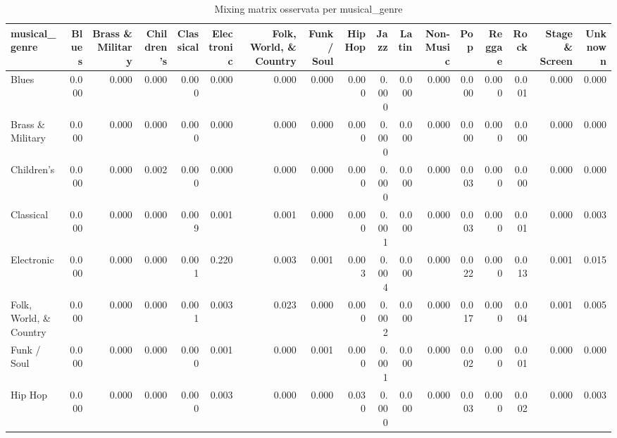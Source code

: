 \begin{table}
\centering
\caption{Mixing matrix osservata per musical_genre}
\label{tab:t3_mixing_genere_musicale_osservata}
\begin{tabular}{lrrrrrrrrrrrrrrrr}
\toprule
         musical\_genre &  Blues &  Brass \& Military &  Children's &  Classical &  Electronic &  Folk, World, \& Country &  Funk / Soul &  Hip Hop &  Jazz &  Latin &  Non-Music &   Pop &  Reggae &  Rock &  Stage \& Screen &  Unknown \\
\midrule
                 Blues &  0.000 &             0.000 &       0.000 &      0.000 &       0.000 &                   0.000 &        0.000 &    0.000 & 0.000 &  0.000 &      0.000 & 0.000 &   0.000 & 0.001 &           0.000 &    0.000 \\
      Brass \& Military &  0.000 &             0.000 &       0.000 &      0.000 &       0.000 &                   0.000 &        0.000 &    0.000 & 0.000 &  0.000 &      0.000 & 0.000 &   0.000 & 0.000 &           0.000 &    0.000 \\
            Children's &  0.000 &             0.000 &       0.002 &      0.000 &       0.000 &                   0.000 &        0.000 &    0.000 & 0.000 &  0.000 &      0.000 & 0.003 &   0.000 & 0.000 &           0.000 &    0.000 \\
             Classical &  0.000 &             0.000 &       0.000 &      0.009 &       0.001 &                   0.001 &        0.000 &    0.000 & 0.001 &  0.000 &      0.000 & 0.003 &   0.000 & 0.001 &           0.000 &    0.003 \\
            Electronic &  0.000 &             0.000 &       0.000 &      0.001 &       0.220 &                   0.003 &        0.001 &    0.003 & 0.004 &  0.000 &      0.000 & 0.022 &   0.000 & 0.013 &           0.001 &    0.015 \\
Folk, World, \& Country &  0.000 &             0.000 &       0.000 &      0.001 &       0.003 &                   0.023 &        0.000 &    0.000 & 0.002 &  0.000 &      0.000 & 0.017 &   0.000 & 0.004 &           0.001 &    0.005 \\
           Funk / Soul &  0.000 &             0.000 &       0.000 &      0.000 &       0.001 &                   0.000 &        0.001 &    0.000 & 0.001 &  0.000 &      0.000 & 0.002 &   0.000 & 0.001 &           0.000 &    0.000 \\
               Hip Hop &  0.000 &             0.000 &       0.000 &      0.000 &       0.003 &                   0.000 &        0.000 &    0.030 & 0.000 &  0.000 &      0.000 & 0.003 &   0.000 & 0.002 &           0.000 &    0.003 \\

\end{tabular}
\end{table}
